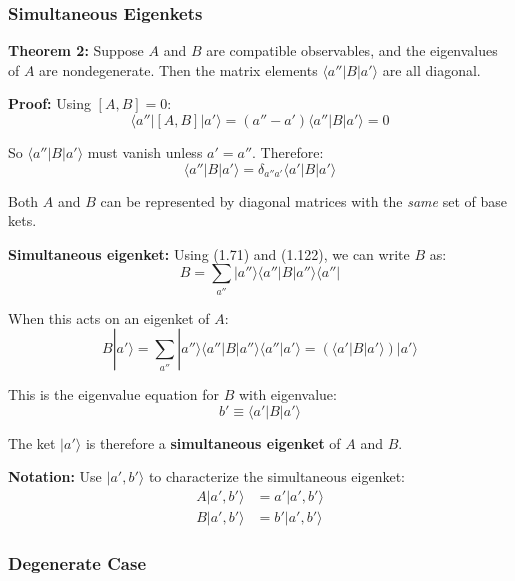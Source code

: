 \documentclass[11pt,a4paper]{article}
\begin{document}
\subsubsection{Simultaneous Eigenkets}

\textbf{Theorem 2:} Suppose $A$ and $B$ are compatible observables, and the eigenvalues of $A$ are nondegenerate. Then the matrix elements $\langle a''|B|a'\rangle$ are all diagonal.

\textbf{Proof:}
Using $[A, B] = 0$:
\begin{equation}
\langle a''|[A, B]|a'\rangle = (a'' - a')\langle a''|B|a'\rangle = 0
\tag{1.121}
\end{equation}

So $\langle a''|B|a'\rangle$ must vanish unless $a' = a''$. Therefore:
\begin{equation}
\langle a''|B|a'\rangle = \delta_{a''a'}\langle a'|B|a'\rangle
\tag{1.122}
\end{equation}

Both $A$ and $B$ can be represented by diagonal matrices with the \textit{same} set of base kets.

\textbf{Simultaneous eigenket:}
Using (1.71) and (1.122), we can write $B$ as:
\begin{equation}
B = \sum_{a''}|a''\rangle\langle a''|B|a''\rangle\langle a''|
\tag{1.123}
\end{equation}

When this acts on an eigenket of $A$:
\begin{equation}
B|a'\rangle = \sum_{a''}|a''\rangle\langle a''|B|a''\rangle\langle a''|a'\rangle = (\langle a'|B|a'\rangle)|a'\rangle
\tag{1.124}
\end{equation}

This is the eigenvalue equation for $B$ with eigenvalue:
\begin{equation}
b' \equiv \langle a'|B|a'\rangle
\tag{1.125}
\end{equation}

The ket $|a'\rangle$ is therefore a \textbf{simultaneous eigenket} of $A$ and $B$.

\textbf{Notation:} Use $|a', b'\rangle$ to characterize the simultaneous eigenket:
\begin{align}
A|a', b'\rangle &= a'|a', b'\rangle \tag{1.127a} \\
B|a', b'\rangle &= b'|a', b'\rangle \tag{1.127b}
\end{align}

\subsubsection{Degenerate Case}
\end{document}
